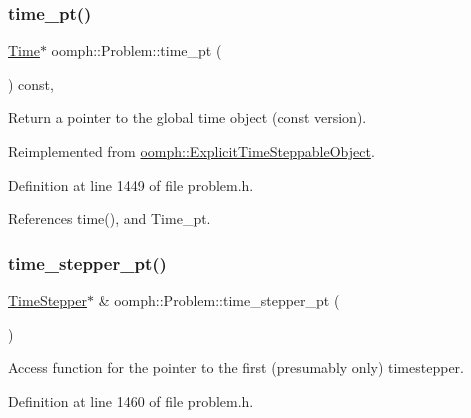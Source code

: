 \subsubsection{\texorpdfstring{time\+\_\+pt()}{time\_pt()}\hspace{0.1cm}{\footnotesize\ttfamily [2/2]}}
{\footnotesize\ttfamily \hyperlink{classoomph_1_1Time}{Time}$\ast$ oomph\+::\+Problem\+::time\+\_\+pt (\begin{DoxyParamCaption}{ }\end{DoxyParamCaption}) const\hspace{0.3cm}{\ttfamily [inline]}, {\ttfamily [virtual]}}



Return a pointer to the global time object (const version). 



Reimplemented from \hyperlink{classoomph_1_1ExplicitTimeSteppableObject_a49ecd5e667dc16d4f2b991598d311b36}{oomph\+::\+Explicit\+Time\+Steppable\+Object}.



Definition at line 1449 of file problem.\+h.



References time(), and Time\+\_\+pt.

\mbox{\label{classoomph_1_1Problem_acfdb74e8522fa5d486064998e7223fc6}} 
\subsubsection{\texorpdfstring{time\+\_\+stepper\+\_\+pt()}{time\_stepper\_pt()}\hspace{0.1cm}{\footnotesize\ttfamily [1/3]}}
{\footnotesize\ttfamily \hyperlink{classoomph_1_1TimeStepper}{Time\+Stepper}$\ast$ \& oomph\+::\+Problem\+::time\+\_\+stepper\+\_\+pt (\begin{DoxyParamCaption}{ }\end{DoxyParamCaption})\hspace{0.3cm}{\ttfamily [inline]}}



Access function for the pointer to the first (presumably only) timestepper. 



Definition at line 1460 of file problem.\+h.



